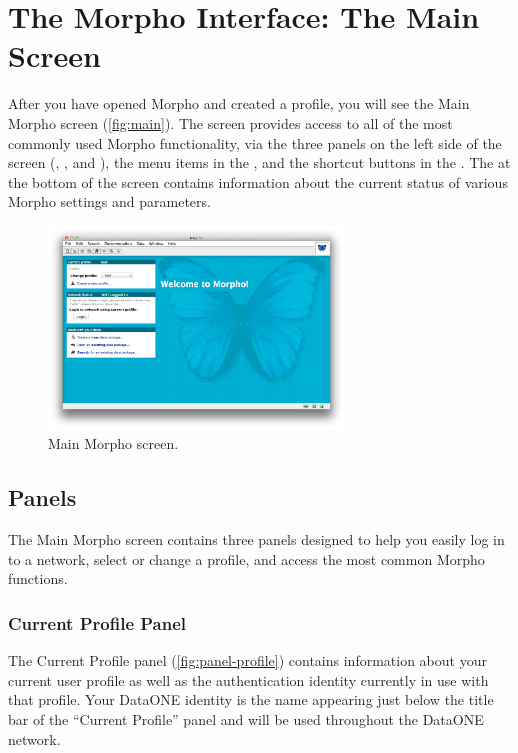 \section{The Morpho Interface: The Main Screen} \label{sec:main}

After you have opened Morpho and created a profile, you will see the
Main Morpho screen (\autoref{fig:main}). The screen provides access to
all of the most commonly used Morpho functionality, via the three panels
on the left side of the screen (,
, and ), the
menu items in the , and the shortcut buttons in
the . The  at the bottom of
the screen contains information about the current status of various
Morpho settings and parameters.

\begin{figure}
  \centering
    \includegraphics[width=0.7\textwidth]{images/main.jpg}
  \caption{Main Morpho screen.}
  \label{fig:main}
\end{figure}

\subsection{Panels}

The Main Morpho screen contains three panels designed to help you easily
log in to a network, select or change a profile, and access the most
common Morpho functions.

\subsubsection[Current profile]{Current Profile Panel}
\label{sec:panel-profile}

The Current Profile panel (\autoref{fig:panel-profile}) contains
information about your current user profile as well as the authentication
identity currently in use with that profile. Your DataONE identity is the name
appearing just below the title bar of the ``Current
Profile'' panel and will be used throughout the DataONE network. 

